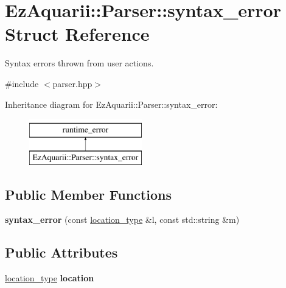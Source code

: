 \hypertarget{structEzAquarii_1_1Parser_1_1syntax__error}{}\section{Ez\+Aquarii\+:\+:Parser\+:\+:syntax\+\_\+error Struct Reference}
\label{structEzAquarii_1_1Parser_1_1syntax__error}


Syntax errors thrown from user actions.  




{\ttfamily \#include $<$parser.\+hpp$>$}

Inheritance diagram for Ez\+Aquarii\+:\+:Parser\+:\+:syntax\+\_\+error\+:\begin{figure}[H]
\begin{center}
\leavevmode
\includegraphics[height=2.000000cm]{structEzAquarii_1_1Parser_1_1syntax__error}
\end{center}
\end{figure}
\subsection*{Public Member Functions}
\begin{DoxyCompactItemize}
\item 
{\bfseries syntax\+\_\+error} (const \hyperlink{classEzAquarii_1_1Parser_acc4b937a827f1be285bf28ec90eeb125}{location\+\_\+type} \&l, const std\+::string \&m)\hypertarget{structEzAquarii_1_1Parser_1_1syntax__error_ad0c4657702d3609ecead4372137a7fe4}{}\label{structEzAquarii_1_1Parser_1_1syntax__error_ad0c4657702d3609ecead4372137a7fe4}

\end{DoxyCompactItemize}
\subsection*{Public Attributes}
\begin{DoxyCompactItemize}
\item 
\hyperlink{classEzAquarii_1_1Parser_acc4b937a827f1be285bf28ec90eeb125}{location\+\_\+type} {\bfseries location}\hypertarget{structEzAquarii_1_1Parser_1_1syntax__error_a7f8386ad39e13d5c883c920400e00d2d}{}\label{structEzAquarii_1_1Parser_1_1syntax__error_a7f8386ad39e13d5c883c920400e00d2d}

\end{DoxyCompactItemize}



